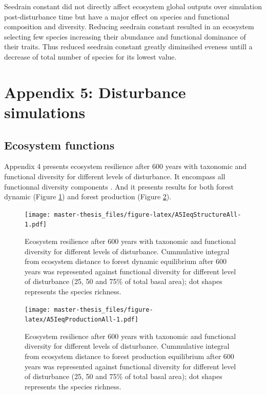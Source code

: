 \documentclass[12pt,]{article}
\let\oldsection\section
\renewcommand\section{\newpage\oldsection}
\theoremstyle{definition}
\theoremstyle{definition}
\theoremstyle{remark}
\begin{document}
Seedrain constant did not directly affect ecosystem global outputs over
simulation post-disturbance time but have a major effect on species and
functional composition and diversity. Reducing seedrain constant
resulted in an ecosystem selecting few species increasing their
abundance and functional dominance of their traits. Thus reduced
seedrain constant greatly diminsihed eveness untill a decrease of total
number of species for its lowest value.

\hypertarget{appendix-5-disturbance-simulations}{\section{Appendix 5:
Disturbance simulations}\label{appendix-5-disturbance-simulations}}

\subsection{Ecosystem functions}\label{ecosystem-functions-2}

Appendix 4 presents ecosystem resilience after 600 years with taxonomic
and functional diversity for different levels of disturbance. It
encompass all functionnal diversity components \citep[FRIC, FEve, FDiv,
and FDis,][]{villeger_new_2008}. And it presents results for both forest
dynamic (Figure \ref{fig:A5IeqStructureAll}) and forest production
(Figure \ref{fig:A5IeqProductionAll}).

\begin{figure}[htbp]
\centering
\texttt{[image: master-thesis\_files/figure-latex/A5IeqStructureAll-1.pdf]}
\caption{\label{fig:A5IeqStructureAll}Ecosystem resilience after 600 years
with taxonomic and functional diversity for different levels of
disturbance. Cummulative integral from ecosystem distance to forest
dynamic equilibrium after 600 years was represented against functional
diversity \citep[FRIC, FEve, FDiv, and FDis,][]{villeger_new_2008} for
different level of disturbance (25, 50 and 75\% of total basal area);
dot shapes represents the species richness.}
\end{figure}

\begin{figure}[htbp]
\centering
\texttt{[image: master-thesis\_files/figure-latex/A5IeqProductionAll-1.pdf]}
\caption{\label{fig:A5IeqProductionAll}Ecosystem resilience after 600 years
with taxonomic and functional diversity for different levels of
disturbance. Cummulative integral from ecosystem distance to forest
production equilibrium after 600 years was represented against
functional diversity \citep[FRIC, FEve, FDiv, and
FDis,][]{villeger_new_2008} for different level of disturbance (25, 50
and 75\% of total basal area); dot shapes represents the species
richness.}
\end{figure}
\end{document}

